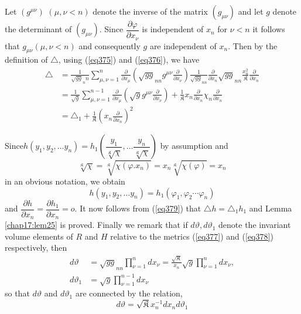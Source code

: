 Let $(g^{\mu \nu})$ $(\mu, \nu < n)$ denote the inverse of the matrix
$(g_{\mu \nu})$ and let $g$ denote the determinant of $(g_{\mu
  \nu})$. Since $\dfrac{\partial \varphi}{\partial x_\nu}$ is
independent of $x_n$ for $\nu < n$ it follows that $g_{\mu \nu} (\mu,
\nu < n)$ and consequently $g$ are independent of $x_n$. Then by the
definition of $\triangle$, using (\ref{eq375}) and (\ref{eq376}), we have 
\begin{align*}
\triangle & = \frac{1}{\sqrt{g g}_nn} \sum^{n}_{\mu, \nu = 1}
\frac{\partial}{\partial x_\mu} (\sqrt{gg}_{nn} g^{\mu \nu}
\frac{\partial}{\partial x_\nu}) \frac{1}{\sqrt {gg}_{nn}}
\frac{\partial}{\partial x _ n} \sqrt{gg}_{nn}
\frac{x^2_n}{\mathfrak{K}} \frac{\partial}{\partial x_n}\\ 
& = \frac{1}{\sqrt {g}} \sum^{n - 1}_{\mu, \nu = 1}
\frac{\partial}{\partial x_\mu} (\sqrt{g} g^{\mu \nu }
\frac{\partial}{\partial x_\nu}) + \frac{1}{\mathfrak{K}} x_n
\frac{\partial}{\partial x_n} \chi_n \frac{\partial}{\partial x_n}\\ 
& = \triangle_1 + \frac{1}{\mathfrak{K}} (x _n \frac{\partial}{\partial
  x_n})^2 \tag{379}\label{eq379}   
\end{align*}

Since\pageoriginale $h (y_1, y_2, \ldots y_n) = h_1 \left(
\dfrac{y_1}{\sqrt[\mathfrak{K}] {\chi}},  \ldots
\dfrac{y_n}{\sqrt[\mathfrak{K}] {\chi}} \right ) $ by assumption and  
\begin{equation*}
\sqrt[\mathfrak{K}] {\chi} = \sqrt[\mathfrak{K}] {\chi (\varphi. x_n)} =
x_n \sqrt[\mathfrak{K}] {\chi (\varphi)}  = x_n \tag{380}\label{eq380}   
\end{equation*}
in an obvious notation, we obtain
$$
h(y_1, y_2, \ldots y_n) = h_1 (\varphi_1, \varphi_2 \cdots \varphi_n)
$$
and $\dfrac{\partial h}{\partial x_n} = \dfrac{\partial h_1}{\partial
  x_n} = o$. It now follows from (\ref{eq379}) that $\triangle h =
\triangle_1 h_1$ and Lemma \ref{chap17:lem25} is proved. Finally we
remark that if 
$d \vartheta, d \vartheta_1$ denote the invariant volume elements of
$R$ and $H$ relative to the metrics (\ref{eq377}) and (\ref{eq378}) respectively,
then   
\begin{align*}
d \vartheta & = \sqrt{gg}_{nn} \prod^n_{\nu = 1} d x_\nu =
\frac{\sqrt{\mathfrak{K}}}{x_n} \sqrt {g} \prod^n_{\nu = 1} dx_\nu,\\ 
d \vartheta_1 & = \sqrt{g} \prod_{\nu = 1}^{n - 1} d x _\nu
\end{align*}
so that $d \vartheta $ and $d \vartheta_1$ are connected by the relation,
\begin{equation*}
d \vartheta = \sqrt{\mathfrak{K}} x^{-1}_n d x _n d \vartheta_1
\tag{381}\label{eq381}    
\end{equation*}

